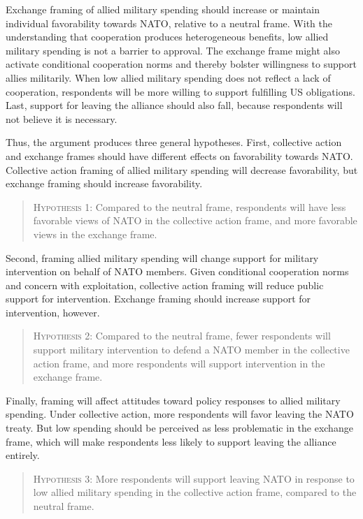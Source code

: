 \documentclass[12pt]{article}
\begin{document}
Exchange framing of allied military spending should increase or maintain individual favorability towards NATO, relative to a neutral frame. 
With the understanding that cooperation produces heterogeneous benefits, low allied military spending is not a barrier to approval. 
The exchange frame might also activate conditional cooperation norms and thereby bolster willingness to support allies militarily. 
When low allied military spending does not reflect a lack of cooperation, respondents will be more willing to support fulfilling US obligations. 
Last, support for leaving the alliance should also fall, because respondents will not believe it is necessary.  


Thus, the argument produces three general hypotheses. 
First, collective action and exchange frames should have different effects on favorability towards NATO. 
Collective action framing of allied military spending will decrease favorability, but exchange framing should increase favorability. 

\begin{quote}
\textsc{Hypothesis 1}: Compared to the neutral frame, respondents will have less favorable views of NATO in the collective action frame, and more favorable views in the exchange frame.  
\end{quote}

Second, framing allied military spending will change support for military intervention on behalf of NATO members. 
Given conditional cooperation norms and concern with exploitation, collective action framing will reduce public support for intervention. 
Exchange framing should increase support for intervention, however. 

\begin{quote}
\textsc{Hypothesis 2}: Compared to the neutral frame, fewer respondents will support military intervention to defend a NATO member in the collective action frame, and more respondents will support intervention in the exchange frame. 
\end{quote} 


Finally, framing will affect attitudes toward policy responses to allied military spending. 
Under collective action, more respondents will favor leaving the NATO treaty. 
But low spending should be perceived as less problematic in the exchange frame, which will make respondents less likely to support leaving the alliance entirely. 


\begin{quote}
\textsc{Hypothesis 3}: More respondents will support leaving NATO in response to low allied military spending in the collective action frame, compared to the neutral frame.
\end{quote}
\end{document}
